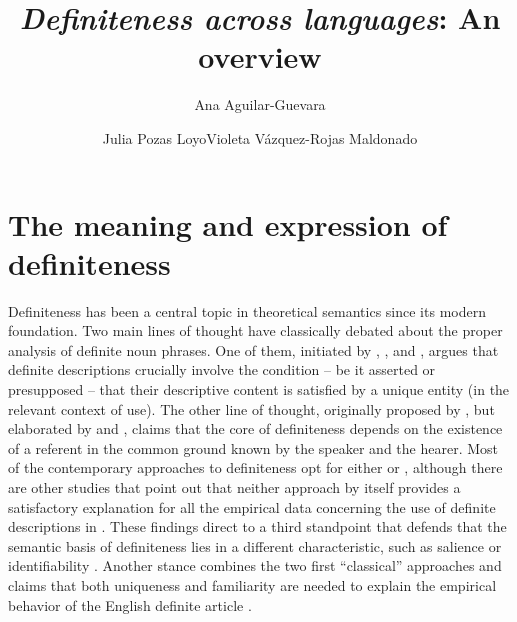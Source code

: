 \documentclass[output=paper]{langsci/langscibook}
\title{\texorpdfstring{\textit{Definiteness across languages}: An overview}{Definiteness across languages: An overview}}
\author{%
 Ana Aguilar-Guevara\affiliation{Universidad Nacional Autónoma de México}\and Julia {Pozas Loyo}\affiliation{El Colegio de México}\lastand Violeta {Vázquez-Rojas Maldonado}\affiliation{El Colegio de México}
}
\begin{document}
\abstract{~}
\maketitle

\section{The meaning and expression of definiteness}

Definiteness has been a central topic in theoretical semantics since its modern foundation. Two main lines of thought have classically debated about the proper analysis of definite noun phrases. One of them, initiated by \citet{Frege1892}, \citet{Russell1905}, and \citet{Strawson1950}, argues that definite descriptions crucially involve the condition -- be it asserted or presupposed -- that their descriptive content is satisfied by a unique entity (in the relevant context of use). The other line of thought, originally proposed by \citet{Christophersen1939}, but elaborated by \citet{Heim1982} and \citet{Kamp1981}, claims that the core of definiteness depends on the existence of a referent in the common ground known by the speaker and the hearer. Most of the contemporary approaches to definiteness opt for either  \citep[e.g.][]{Hawkins1978,Kadmon1990,Hawkins1991,Abbott1999} or  \citep[e.g.][]{Green1996,Chafe1996}, although there are other studies that point out that neither approach by itself provides a satisfactory explanation for all the empirical data concerning the use of definite descriptions in  \citep[e.g.][]{BirnerWard1994}. These findings direct to a third standpoint that defends that the semantic basis of definiteness lies in a different characteristic, such as salience \citep{Lewis1979} or identifiability \citep{BirnerWard1994}. Another stance combines the two first “classical” approaches and claims that both uniqueness and familiarity are needed to explain the empirical behavior of the English definite article \citep{Farkas2002,Roberts2003}.
\end{document}
